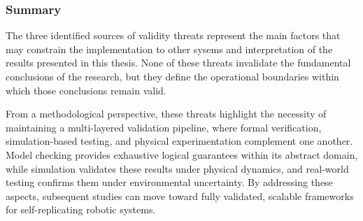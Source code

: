 \subsubsection{Summary}

The three identified sources of validity threats represent the main 
factors that may constrain the implementation to other sysems and interpretation of 
the results presented in this thesis. 
None of these threats invalidate the fundamental conclusions of 
the research, but they define the operational boundaries within which 
those conclusions remain valid.

From a methodological perspective, these threats highlight the necessity of 
maintaining a multi-layered validation pipeline, where formal verification, 
simulation-based testing, and physical experimentation complement one 
another. 
Model checking provides exhaustive logical guarantees within its 
abstract domain, while simulation validates these results under physical 
dynamics, and real-world testing confirms them under environmental uncertainty.
By addressing these aspects, subsequent studies can move toward fully 
validated, scalable frameworks for self-replicating robotic systems.
